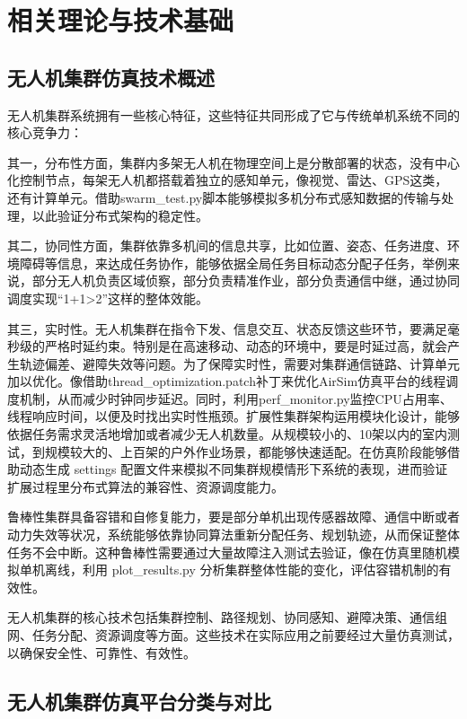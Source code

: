 

\chapter{相关理论与技术基础}

\section{无人机集群仿真技术概述}

无人机集群系统拥有一些核心特征，这些特征共同形成了它与传统单机系统不同的核心竞争力：

其一，分布性方面，集群内多架无人机在物理空间上是分散部署的状态，没有中心化控制节点，每架无人机都搭载着独立的感知单元，像视觉、雷达、GPS这类，还有计算单元。借助swarm\_test.py脚本能够模拟多机分布式感知数据的传输与处理，以此验证分布式架构的稳定性。

其二，协同性方面，集群依靠多机间的信息共享，比如位置、姿态、任务进度、环境障碍等信息，来达成任务协作，能够依据全局任务目标动态分配子任务，举例来说，部分无人机负责区域侦察，部分负责精准作业，部分负责通信中继，通过协同调度实现``1+1\textgreater2''这样的整体效能。

其三，实时性。无人机集群在指令下发、信息交互、状态反馈这些环节，要满足毫秒级的严格时延约束。特别是在高速移动、动态的环境中，要是时延过高，就会产生轨迹偏差、避障失效等问题。为了保障实时性，需要对集群通信链路、计算单元加以优化。像借助thread\_optimization.patch补丁来优化AirSim仿真平台的线程调度机制，从而减少时钟同步延迟。同时，利用perf\_monitor.py监控CPU占用率、线程响应时间，以便及时找出实时性瓶颈。扩展性集群架构运用模块化设计，能够依据任务需求灵活地增加或者减少无人机数量。从规模较小的、10架以内的室内测试，到规模较大的、上百架的户外作业场景，都能够快速适配。在仿真阶段能够借助动态生成
settings
配置文件来模拟不同集群规模情形下系统的表现，进而验证扩展过程里分布式算法的兼容性、资源调度能力。

鲁棒性集群具备容错和自修复能力，要是部分单机出现传感器故障、通信中断或者动力失效等状况，系统能够依靠协同算法重新分配任务、规划轨迹，从而保证整体任务不会中断。这种鲁棒性需要通过大量故障注入测试去验证，像在仿真里随机模拟单机离线，利用
plot\_results.py 分析集群整体性能的变化，评估容错机制的有效性。

无人机集群的核心技术包括集群控制、路径规划、协同感知、避障决策、通信组网、任务分配、资源调度等方面。这些技术在实际应用之前要经过大量仿真测试，以确保安全性、可靠性、有效性。

\section{无人机集群仿真平台分类与对比}

